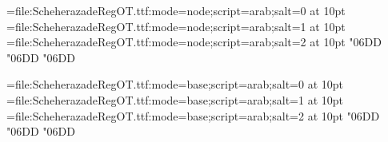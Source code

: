
\font\0=file:ScheherazadeRegOT.ttf:mode=node;script=arab;salt=0 at 10pt
\font\1=file:ScheherazadeRegOT.ttf:mode=node;script=arab;salt=1 at 10pt
\font\2=file:ScheherazadeRegOT.ttf:mode=node;script=arab;salt=2 at 10pt
\0 \char"06DD
\1 \char"06DD
\2 \char"06DD

\font\0=file:ScheherazadeRegOT.ttf:mode=base;script=arab;salt=0 at 10pt
\font\1=file:ScheherazadeRegOT.ttf:mode=base;script=arab;salt=1 at 10pt
\font\2=file:ScheherazadeRegOT.ttf:mode=base;script=arab;salt=2 at 10pt
\0 \char"06DD
\1 \char"06DD
\2 \char"06DD
\bye
\bye
